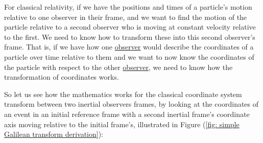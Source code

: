 For classical relativity, if we have the positions and times of a particle's motion relative to one observer in their frame, and we want to find the motion of the particle relative to a second observer who is moving at constant velocity relative to the first.
We need to know how to transform these into this second observer's frame.
That is, if we have how one \hyperlink{def-observer}{observer} would describe the coordinates of a particle over time relative to them and we want to now know the coordinates of the particle with respect to the other \hyperlink{def-observer}{observer}, we need to know how the transformation of coordinates works.

So let us see how the mathematics works for the classical coordinate system transform between two inertial observers frames, by looking at the coordinates of an event in an initial reference frame with a second inertial frame's coordinate axis moving relative to the initial frame's, illustrated in Figure (\ref{fig: simple Galilean transform derivation}):

